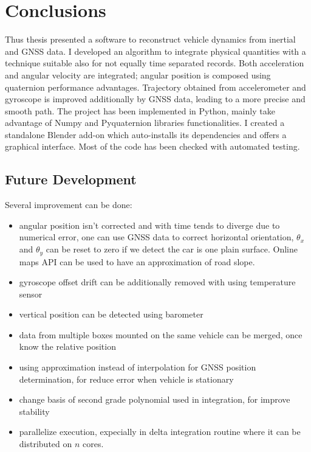 \chapter{Conclusions}
\label{chap:conclusions}

Thus thesis presented a software to reconstruct vehicle dynamics from inertial and GNSS data.
I developed an algorithm to integrate physical quantities with a technique suitable also for not equally time separated records. Both acceleration and angular velocity are integrated; angular position is composed using quaternion performance advantages.
Trajectory obtained from accelerometer and gyroscope is improved additionally by GNSS data, leading to a more precise and smooth path.
The project has been implemented in Python, mainly take advantage of Numpy and Pyquaternion libraries functionalities.
I created a standalone Blender add-on which auto-installs its dependencies and offers a graphical interface. Most of the code has been checked with automated testing.

\section{Future Development}
Several improvement can be done:
\begin{itemize}
\item angular position isn't corrected and with time tends to diverge due to numerical error, one can use GNSS data to correct horizontal orientation, $\theta_x$ and $\theta_y$ can be reset to zero if we detect the car is one plain surface. Online maps API can be used to have an approximation of road slope.
\item gyroscope offset drift can be additionally removed with using temperature sensor
\item vertical position can be detected using barometer
\item data from multiple boxes mounted on the same vehicle can be merged, once know the relative position
\item using approximation instead of interpolation for GNSS position determination, for reduce error when vehicle is stationary
\item change basis of second grade polynomial used in integration, for improve stability
\item parallelize execution, expecially in delta integration routine where it can be distributed on $n$ cores.
\end{itemize}